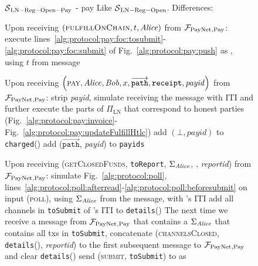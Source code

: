 \begin{figure}[H]
  \begin{simulatorbox}{$\mathcal{S}{}_{\mathrm{LN - Reg - Open - Pay}}$ - pay}
    Like $\mathcal{S}{}_{\mathrm{LN - Reg - Open}}$. Differences:
    \begin{algorithmic}[1]
      \State Upon receiving $\left(\textsc{fulfillOnChain}, t, \mathit{Alice}\right)$
      from $\mathcal{F}_{\mathrm{PayNet}}{}_{\mathrm{, Pay}}$:
      \label{alg:sim:pay:foc:top}
      \Indent
        \State execute
        lines~\ref{alg:protocol:pay:foc:tosubmit}-\ref{alg:protocol:pay:foc:submit}
        of Fig.~\ref{alg:protocol:pay:push} as \alice{}, using $t$ from message
        \label{alg:sim:pay:foc:run}
      \EndIndent
      \Statex

      \State Upon receiving $\left(\textsc{pay}, \mathit{Alice}, \mathit{Bob}, x,
      \overrightarrow{\mathtt{path}}, \mathtt{receipt}, \mathit{payid}\right)$
      from $\mathcal{F}_{\mathrm{PayNet}}{}_{\mathrm{, Pay}}$:
      \Indent
        \State strip \textit{payid}, simulate receiving the message with
        \alice{} ITI and further execute the parts of $\Pi_{\mathrm{LN}}$ that
        correspond to honest parties (Fig.~\ref{alg:protocol:pay:invoice}-
        Fig.~\ref{alg:protocol:pay:updateFulfillHtlc})
        \label{alg:sim:pay:simulate}
         
          \State add $\left(\bot, \mathit{payid}\right)$ to
          \texttt{charged}(\alice)
        \Else
          \State add ($\overrightarrow{\mathtt{path}}$, \textit{payid}) to
          \texttt{payids}
        \EndIf
      \EndIndent
      \Statex

      \State Upon receiving (\textsc{getClosedFunds}, \texttt{toReport},
      $\Sigma_{\mathit{Alice}}$, \alice, \textit{reportid}) from $\mathcal{F}_{\mathrm{PayNet}}{}_{\mathrm{,
      Pay}}$:
      \Indent
        \State simulate Fig.~\ref{alg:protocol:poll},
        lines~\ref{alg:protocol:poll:afterread}-\ref{alg:protocol:poll:beforesubmit}
        on input (\textsc{poll}), using $\Sigma_{\mathit{Alice}}$ from the message, with
        \alice's ITI
        \label{alg:sim:poll:run}
        \State add all channels in \texttt{toSubmit} of \alice's ITI to
        \texttt{details}(\alice)
        \label{alg:sim:poll:save}
        \State The next time we receive a message from $\mathcal{F}_{\mathrm{PayNet}}{}_{\mathrm{,
        Pay}}$ that contains a $\Sigma_{\mathit{Alice}}$ that contains all txs in
        \texttt{toSubmit}, concatenate (\textsc{channelsClosed},
        \texttt{details}(\alice), \textit{reportid}) to the first subsequent
        message to $\mathcal{F}_{\mathrm{PayNet}}{}_{\mathrm{, Pay}}$ and clear
        \texttt{details}(\alice)
        \label{alg:sim:poll:inform}
        \State send (\textsc{submit}, \texttt{toSubmit}) to \ledger{} as \alice
        \label{alg:sim:poll:submit}
      \EndIndent
      \Statex


\end{algorithmic}
\end{simulatorbox}
\end{figure}
